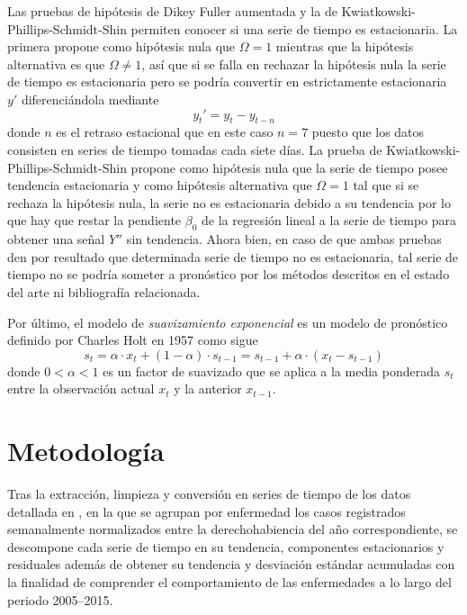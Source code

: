 \documentclass[final,5p,times,twocolumn]{elsarticle}
\begin{document}
Las pruebas de hipótesis de Dikey Fuller aumentada y la de Kwiatkowski-Phillips-Schmidt-Shin permiten conocer si una serie de tiempo es estacionaria. La primera propone como hipótesis nula que $\Omega = 1$ mientras que la hipótesis alternativa es que $\Omega \neq 1$, así que si se falla en rechazar la hipótesis nula la serie de tiempo es estacionaria pero se podría convertir en estrictamente estacionaria $y'$ diferenciándola mediante
\begin{equation}
  \label{eq:diff}
  y_t ' = y_{t}-y_{t-n}
\end{equation}
donde $n$ es el retraso estacional que en este caso $n = 7$ puesto que los datos consisten en series de tiempo tomadas cada siete días. La prueba de Kwiatkowski-Phillips-Schmidt-Shin propone como hipótesis nula que la serie de tiempo posee tendencia estacionaria y como hipótesis alternativa que $\Omega = 1$ tal que si se rechaza la hipótesis nula, la serie no es estacionaria debido a su tendencia por lo que hay que restar la pendiente $\beta_0$ de la regresión lineal a la serie de tiempo para obtener una señal $Y''$ sin tendencia. Ahora bien, en caso de que ambas pruebas den por resultado que determinada serie de tiempo no es estacionaria, tal serie de tiempo no se podría someter a pronóstico por los métodos descritos en el estado del arte ni bibliografía relacionada.

Por último, el modelo de \textit{suavizamiento exponencial} es un modelo de pronóstico definido por Charles Holt en 1957 \cite{holt2004} como sigue
\begin{equation}
  s_{t}=\alpha \cdot x_{t}+(1-\alpha )\cdot s_{t-1}=s_{t-1}+\alpha \cdot (x_{t}-s_{t-1})
\end{equation}
donde $0 < \alpha < 1$ es un factor de suavizado que se aplica a la media ponderada $s_t$ entre la observación actual $x_t$ y la anterior $x_{t - 1}$.

\section{Metodología}
\label{sec:metodology}
Tras la extracción, limpieza y conversión en series de tiempo de los datos detallada en \cite{benavides2019}, en la que se agrupan por enfermedad los casos registrados semanalmente normalizados entre la derechohabiencia del año correspondiente, se descompone cada serie de tiempo en su tendencia, componentes estacionarios y residuales además de obtener su tendencia y desviación estándar acumuladas con la finalidad de comprender el comportamiento de las enfermedades a lo largo del periodo 2005--2015.
\end{document}
